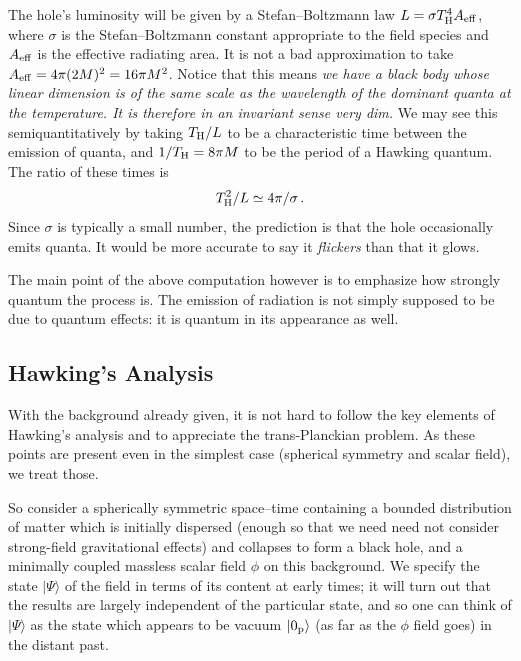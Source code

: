 \documentclass[
%
draft    %
,numberedheadings 
,bibliocites
  ]
  {aipproc}
\begin{document}
The hole's luminosity will be given by a Stefan--Boltzmann law $L=\sigma T^4_{\rm H}A_{\rm eff}$, where $\sigma$ is the Stefan--Boltzmann constant appropriate to the field species and $A_{\rm eff}$ is the effective radiating area.  It is not a bad approximation to take $A_{\rm eff}=4\pi (2M)^2=16\pi M^2$.  Notice that this means {\em we have a black body whose linear dimension is of the same scale as the wavelength of the dominant quanta at the temperature.  It is therefore in an invariant sense very dim.}  We may see this semiquantitatively by taking 
$T_{\rm H}/L$ to be a characteristic time between the emission of quanta, and $1/T_{\rm H}=8\pi M$ to be the period of a Hawking quantum.  The ratio of these times is
\begin{equation} 
  T_{\rm H}^2/L\simeq 4\pi/\sigma \, .
\end{equation}
Since $\sigma$ is typically a small number, the prediction is that the hole occasionally emits quanta.  It would be more accurate to say it {\em flickers} than that it glows.

The main point of the above computation however is to emphasize how strongly quantum the process is.  The emission of radiation is not simply supposed to be due to quantum effects:  it is quantum in its appearance as well.


\subsection{Hawking's Analysis}

With the background already given, it is not hard to follow the key elements of Hawking's analysis and to appreciate the trans-Planckian problem.  As these points are present even in the simplest case (spherical symmetry and scalar field), we treat those.

So consider a spherically symmetric space--time containing a bounded distribution of matter which is initially dispersed (enough so that we need need not consider strong-field gravitational effects)
and collapses to form a black hole, and a minimally coupled massless scalar field $\phi$ on this background.  We specify the state $|\Psi\rangle$ of the field in terms of its content at early times; it will turn out that the results are largely independent of the particular state, and so one can think of $|\Psi\rangle$ as the state which appears to be vacuum $|0_{\rm p}\rangle$ (as far as the $\phi$ field goes) in the distant past.
\end{document}
